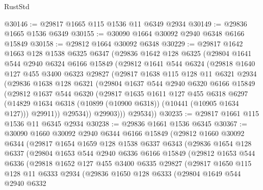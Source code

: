 \begin{lexlean}{RustStd}
\begin{coremodule}
@30146 := @29817 @1665 @115 @1536 @11 @6349 @2934
@30149 := @29836 @1665 @1536 @6349
@30155 := @30090 @1664 @30092 @2940 @6348 @6166 @15849
@30158 := @29812 @1664 @30092 @6348
@30229 := @29817
    @1642
    @1663
    @128
    @1538
    @6325
    @6347
    (@29836
      @1642
      @128
      @6325
      (@29804
        @1641
        @544
        @2940
        @6324
        @6166
        @15849
        (@29812
          @1641
          @544
          @6324
          (@29818
            @1640
            @127
            @455
            @3400
            @6323
            @29827
            (@29817
              @1638
              @115
              @128
              @11
              @6321
              @2934
              (@29836
                @1638
                @128
                @6321
                (@29804
                  @1637
                  @544
                  @2940
                  @6320
                  @6166
                  @15849
                  (@29812
                    @1637
                    @544
                    @6320
                    (@29817
                      @1635
                      @1611
                      @127
                      @455
                      @6318
                      @6297
                      (@14829 @1634 @6318 (@10899 (@10900 @6318)) (@10441 (@10905 @1634 @127)))
                      @29911))
                  @29534))
              @29903)))
        @29534))
@30235 := @29817 @1661 @115 @1536 @11 @6345 @2934
@30238 := @29836 @1661 @1536 @6345
@30367 := @30090
    @1660
    @30092
    @2940
    @6344
    @6166
    @15849
    (@29812
      @1660
      @30092
      @6344
      (@29817
        @1654
        @1659
        @128
        @1538
        @6337
        @6343
        (@29836
          @1654
          @128
          @6337
          (@29804
            @1653
            @544
            @2940
            @6336
            @6166
            @15849
            (@29812
              @1653
              @544
              @6336
              (@29818
                @1652
                @127
                @455
                @3400
                @6335
                @29827
                (@29817
                  @1650
                  @115
                  @128
                  @11
                  @6333
                  @2934
                  (@29836
                    @1650
                    @128
                    @6333
                    (@29804
                      @1649
                      @544
                      @2940
                      @6332

\end{coremodule}
\end{lexlean}

